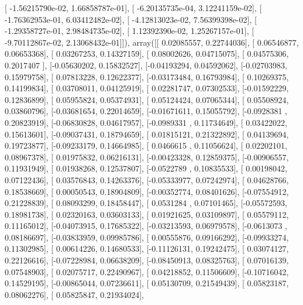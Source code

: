 \documentclass{article}
\begin{document}
       [ -1.56215790e-02,   1.66858787e-01],
       [ -6.20135735e-04,   3.12241159e-02],
       [ -1.76362953e-01,   6.03412482e-02],
       [ -4.12813023e-02,   7.56399398e-02],
       [ -1.29358727e-01,   2.98484735e-02],
       [  1.12392390e-02,   1.25267157e-01],
       [ -9.70112867e-02,   2.13068432e-01]]), array([[ 0.02085557,  0.22744036],
       [ 0.06546877,  0.06653368],
       [ 0.03267253,  0.14327159],
       [ 0.08002626,  0.04715075],
       [ 0.04575306,  0.2017407 ],
       [-0.05630202,  0.15832527],
       [-0.04193294,  0.04592062],
       [-0.02703983,  0.15979758],
       [ 0.07813228,  0.12622377],
       [-0.03173484,  0.16793984],
       [ 0.10269375,  0.14199834],
       [ 0.03708011,  0.04125919],
       [ 0.02281747,  0.07302533],
       [-0.01592229,  0.12836899],
       [ 0.05955824,  0.05374931],
       [ 0.05124424,  0.07065344],
       [ 0.05508924,  0.03860796],
       [-0.03681654,  0.22014659],
       [-0.01671611,  0.15055792],
       [-0.0928381 ,  0.20823919],
       [-0.06830828,  0.04617957],
       [-0.0989331 ,  0.11734649],
       [ 0.03422022,  0.15613601],
       [-0.09037431,  0.18794659],
       [ 0.01815121,  0.21322892],
       [ 0.04139694,  0.19723877],
       [-0.09233179,  0.14664985],
       [ 0.0466615 ,  0.11056624],
       [ 0.02202101,  0.08967378],
       [ 0.01975832,  0.06216131],
       [-0.00423328,  0.12859375],
       [-0.00906557,  0.11931949],
       [ 0.01938268,  0.12537807],
       [-0.0522789 ,  0.10835533],
       [ 0.00198042,  0.07122436],
       [ 0.03576843,  0.14263376],
       [-0.05333977,  0.07242974],
       [ 0.04628766,  0.18538669],
       [ 0.00050543,  0.18904809],
       [-0.00352774,  0.08401626],
       [-0.07554912,  0.21228839],
       [ 0.08093299,  0.18458447],
       [ 0.0531284 ,  0.07101465],
       [-0.05572593,  0.18981738],
       [ 0.02320163,  0.03603133],
       [ 0.01921625,  0.03109897],
       [ 0.05579112,  0.11165012],
       [-0.04073915,  0.17685322],
       [-0.03213593,  0.06979578],
       [-0.0613073 ,  0.08186697],
       [-0.03833959,  0.09985786],
       [ 0.00555876,  0.09166292],
       [-0.09933274,  0.11302985],
       [ 0.00614226,  0.14680533],
       [-0.11126131,  0.19242475],
       [ 0.03074127,  0.22126616],
       [-0.07228984,  0.06638209],
       [-0.08450913,  0.08325763],
       [ 0.07016139,  0.07548903],
       [ 0.02075717,  0.22490967],
       [ 0.04218852,  0.11506609],
       [-0.10716042,  0.14529195],
       [-0.00865044,  0.07236611],
       [ 0.05130709,  0.21549439],
       [ 0.05823187,  0.08062276],
       [ 0.05825847,  0.21934024],
\end{document}
